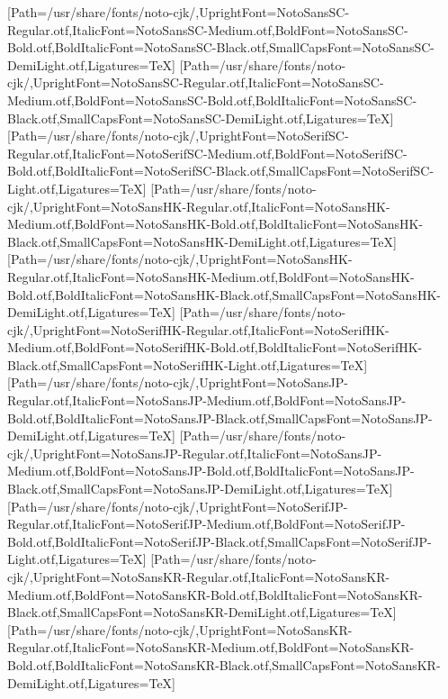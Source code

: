 \newfontfamily{}[Path=/usr/share/fonts/noto-cjk/,UprightFont=NotoSansSC-Regular.otf,ItalicFont=NotoSansSC-Medium.otf,BoldFont=NotoSansSC-Bold.otf,BoldItalicFont=NotoSansSC-Black.otf,SmallCapsFont=NotoSansSC-DemiLight.otf,Ligatures=TeX]
\newfontfamily{}[Path=/usr/share/fonts/noto-cjk/,UprightFont=NotoSansSC-Regular.otf,ItalicFont=NotoSansSC-Medium.otf,BoldFont=NotoSansSC-Bold.otf,BoldItalicFont=NotoSansSC-Black.otf,SmallCapsFont=NotoSansSC-DemiLight.otf,Ligatures=TeX]
\newfontfamily{}[Path=/usr/share/fonts/noto-cjk/,UprightFont=NotoSerifSC-Regular.otf,ItalicFont=NotoSerifSC-Medium.otf,BoldFont=NotoSerifSC-Bold.otf,BoldItalicFont=NotoSerifSC-Black.otf,SmallCapsFont=NotoSerifSC-Light.otf,Ligatures=TeX]
\newfontfamily{}[Path=/usr/share/fonts/noto-cjk/,UprightFont=NotoSansHK-Regular.otf,ItalicFont=NotoSansHK-Medium.otf,BoldFont=NotoSansHK-Bold.otf,BoldItalicFont=NotoSansHK-Black.otf,SmallCapsFont=NotoSansHK-DemiLight.otf,Ligatures=TeX]
\newfontfamily{}[Path=/usr/share/fonts/noto-cjk/,UprightFont=NotoSansHK-Regular.otf,ItalicFont=NotoSansHK-Medium.otf,BoldFont=NotoSansHK-Bold.otf,BoldItalicFont=NotoSansHK-Black.otf,SmallCapsFont=NotoSansHK-DemiLight.otf,Ligatures=TeX]
\newfontfamily{}[Path=/usr/share/fonts/noto-cjk/,UprightFont=NotoSerifHK-Regular.otf,ItalicFont=NotoSerifHK-Medium.otf,BoldFont=NotoSerifHK-Bold.otf,BoldItalicFont=NotoSerifHK-Black.otf,SmallCapsFont=NotoSerifHK-Light.otf,Ligatures=TeX]
\newfontfamily{}[Path=/usr/share/fonts/noto-cjk/,UprightFont=NotoSansJP-Regular.otf,ItalicFont=NotoSansJP-Medium.otf,BoldFont=NotoSansJP-Bold.otf,BoldItalicFont=NotoSansJP-Black.otf,SmallCapsFont=NotoSansJP-DemiLight.otf,Ligatures=TeX]
\newfontfamily{}[Path=/usr/share/fonts/noto-cjk/,UprightFont=NotoSansJP-Regular.otf,ItalicFont=NotoSansJP-Medium.otf,BoldFont=NotoSansJP-Bold.otf,BoldItalicFont=NotoSansJP-Black.otf,SmallCapsFont=NotoSansJP-DemiLight.otf,Ligatures=TeX]
\newfontfamily{}[Path=/usr/share/fonts/noto-cjk/,UprightFont=NotoSerifJP-Regular.otf,ItalicFont=NotoSerifJP-Medium.otf,BoldFont=NotoSerifJP-Bold.otf,BoldItalicFont=NotoSerifJP-Black.otf,SmallCapsFont=NotoSerifJP-Light.otf,Ligatures=TeX]
\newfontfamily{}[Path=/usr/share/fonts/noto-cjk/,UprightFont=NotoSansKR-Regular.otf,ItalicFont=NotoSansKR-Medium.otf,BoldFont=NotoSansKR-Bold.otf,BoldItalicFont=NotoSansKR-Black.otf,SmallCapsFont=NotoSansKR-DemiLight.otf,Ligatures=TeX]
\newfontfamily{}[Path=/usr/share/fonts/noto-cjk/,UprightFont=NotoSansKR-Regular.otf,ItalicFont=NotoSansKR-Medium.otf,BoldFont=NotoSansKR-Bold.otf,BoldItalicFont=NotoSansKR-Black.otf,SmallCapsFont=NotoSansKR-DemiLight.otf,Ligatures=TeX]
